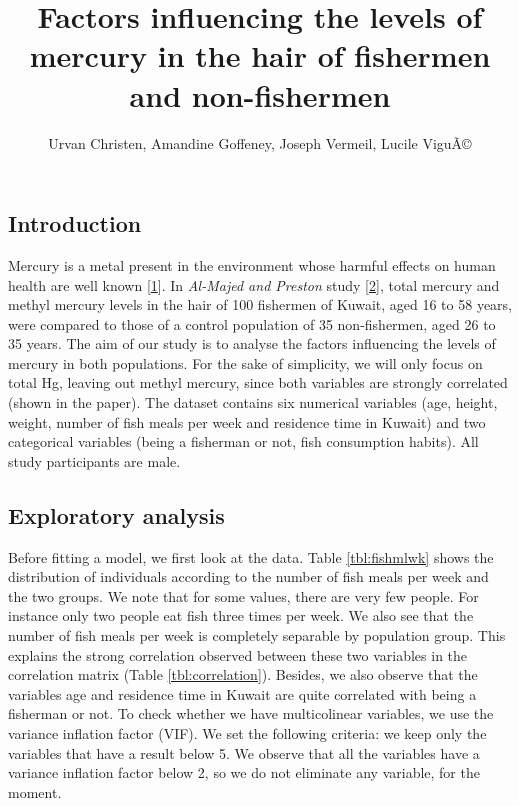 \documentclass[12pt,]{article}
\title{Factors influencing the levels of mercury in the hair of fishermen and
non-fishermen}
\author{Urvan Christen, Amandine Goffeney, Joseph Vermeil, Lucile ViguÃ©}
\date{}
\begin{document}
\maketitle

\subsection{Introduction}\label{introduction}

Mercury is a metal present in the environment whose harmful effects on
human health are well known
{[}\protect\hyperlink{ref-park2012human}{1}{]}. In \emph{Al-Majed and
Preston} study {[}\protect\hyperlink{ref-al2000factors}{2}{]}, total
mercury and methyl mercury levels in the hair of 100 fishermen of
Kuwait, aged 16 to 58 years, were compared to those of a control
population of 35 non-fishermen, aged 26 to 35 years. The aim of our
study is to analyse the factors influencing the levels of mercury in
both populations. For the sake of simplicity, we will only focus on
total Hg, leaving out methyl mercury, since both variables are strongly
correlated (shown in the paper). The dataset contains six numerical
variables (age, height, weight, number of fish meals per week and
residence time in Kuwait) and two categorical variables (being a
fisherman or not, fish consumption habits). All study participants are
male.

\subsection{Exploratory analysis}\label{exploratory-analysis}

Before fitting a model, we first look at the data. Table
\ref{tbl:fishmlwk} shows the distribution of individuals according to
the number of fish meals per week and the two groups. We note that for
some values, there are very few people. For instance only two people eat
fish three times per week. We also see that the number of fish meals per
week is completely separable by population group. This explains the
strong correlation observed between these two variables in the
correlation matrix (Table \ref{tbl:correlation}). Besides, we also
observe that the variables age and residence time in Kuwait are quite
correlated with being a fisherman or not. To check whether we have
multicolinear variables, we use the variance inflation factor (VIF). We
set the following criteria: we keep only the variables that have a
result below 5. We observe that all the variables have a variance
inflation factor below 2, so we do not eliminate any variable, for the
moment.
\end{document}

